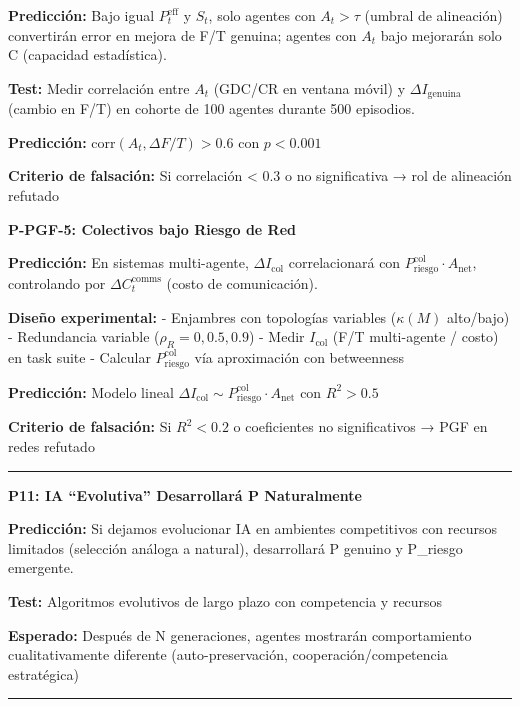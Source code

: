 \textbf{Predicción:} Bajo igual \(P^{\text{eff}}_t\) y \(S_t\), solo
agentes con \(A_t > \tau\) (umbral de alineación) convertirán error en
mejora de F/T genuina; agentes con \(A_t\) bajo mejorarán solo C
(capacidad estadística).

\textbf{Test:} Medir correlación entre \(A_t\) (GDC/CR en ventana móvil)
y \(\Delta I_{\text{genuina}}\) (cambio en F/T) en cohorte de 100
agentes durante 500 episodios.

\textbf{Predicción:} \(\text{corr}(A_t, \Delta F/T) > 0.6\) con
\(p < 0.001\)

\textbf{Criterio de falsación:} Si correlación \textless{} 0.3 o no
significativa → rol de alineación refutado

\textbf{P-PGF-5: Colectivos bajo Riesgo de Red}

\textbf{Predicción:} En sistemas multi-agente, \(\Delta I_{\text{col}}\)
correlacionará con
\(P^{\text{col}}_{\text{riesgo}} \cdot A_{\text{net}}\), controlando por
\(\Delta C_t^{\text{comms}}\) (costo de comunicación).

\textbf{Diseño experimental:} - Enjambres con topologías variables
(\(\kappa(M)\) alto/bajo) - Redundancia variable
(\(\rho_R = 0, 0.5, 0.9\)) - Medir \(I_{\text{col}}\) (F/T multi-agente
/ costo) en task suite - Calcular \(P^{\text{col}}_{\text{riesgo}}\) vía
aproximación con betweenness

\textbf{Predicción:} Modelo lineal
\(\Delta I_{\text{col}} \sim P^{\text{col}}_{\text{riesgo}} \cdot A_{\text{net}}\)
con \(R^2 > 0.5\)

\textbf{Criterio de falsación:} Si \(R^2 < 0.2\) o coeficientes no
significativos → PGF en redes refutado

\begin{center}\rule{0.5\linewidth}{0.5pt}\end{center}

\textbf{P11: IA ``Evolutiva'' Desarrollará P Naturalmente}

\textbf{Predicción:} Si dejamos evolucionar IA en ambientes competitivos
con recursos limitados (selección análoga a natural), desarrollará P
genuino y P\_riesgo emergente.

\textbf{Test:} Algoritmos evolutivos de largo plazo con competencia y
recursos

\textbf{Esperado:} Después de N generaciones, agentes mostrarán
comportamiento cualitativamente diferente (auto-preservación,
cooperación/competencia estratégica)

\begin{center}\rule{0.5\linewidth}{0.5pt}\end{center}

